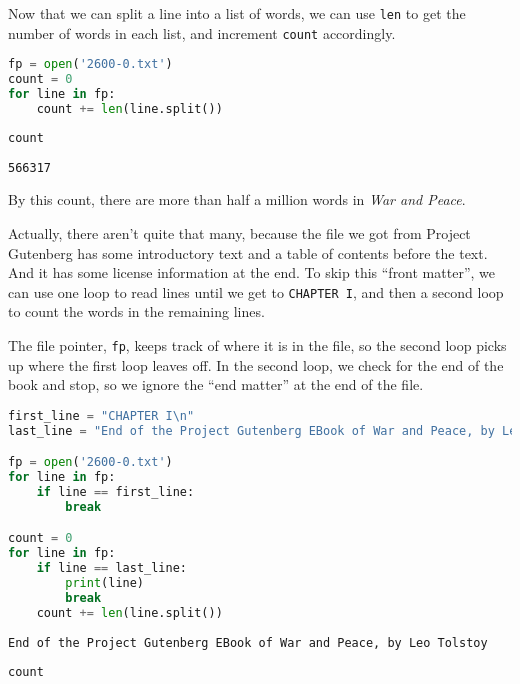 Now that we can split a line into a list of words, we can use
\passthrough{\lstinline!len!} to get the number of words in each list,
and increment \passthrough{\lstinline!count!} accordingly.

\begin{lstlisting}[language=Python,style=source]
fp = open('2600-0.txt')
count = 0
for line in fp:
    count += len(line.split())
\end{lstlisting}

\begin{lstlisting}[language=Python,style=source]
count
\end{lstlisting}

\begin{lstlisting}[style=output]
566317
\end{lstlisting}

By this count, there are more than half a million words in \emph{War and
Peace}.

Actually, there aren't quite that many, because the file we got from
Project Gutenberg has some introductory text and a table of contents
before the text. And it has some license information at the end. To skip
this ``front matter'', we can use one loop to read lines until we get to
\passthrough{\lstinline!CHAPTER I!}, and then a second loop to count the
words in the remaining lines.

The file pointer, \passthrough{\lstinline!fp!}, keeps track of where it
is in the file, so the second loop picks up where the first loop leaves
off. In the second loop, we check for the end of the book and stop, so
we ignore the ``end matter'' at the end of the file.

\begin{lstlisting}[language=Python,style=source]
first_line = "CHAPTER I\n"
last_line = "End of the Project Gutenberg EBook of War and Peace, by Leo Tolstoy\n"

fp = open('2600-0.txt')
for line in fp:
    if line == first_line:
        break

count = 0
for line in fp:
    if line == last_line:
        print(line)
        break
    count += len(line.split())
\end{lstlisting}

\begin{lstlisting}[style=output]
End of the Project Gutenberg EBook of War and Peace, by Leo Tolstoy
\end{lstlisting}

\begin{lstlisting}[language=Python,style=source]
count
\end{lstlisting}


